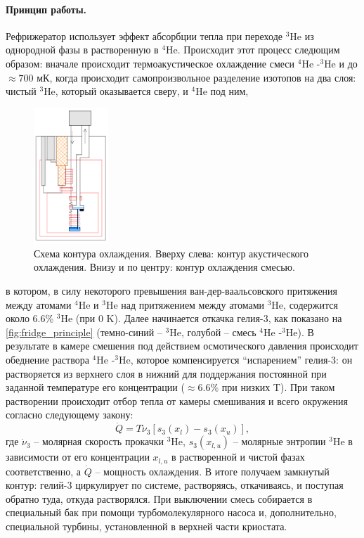 \documentclass[12pt, twoside]{report}
\numberwithin{equation}{section}
\numberwithin{figure}{section}
\begin{document}
\paragraph{Принцип работы.} Рефрижератор использует эффект абсорбции тепла при переходе $^3$He из однородной фазы в растворенную в $^4$He. Происходит этот процесс следющим образом: вначале происходит термоакустическое охлаждение смеси $^4$He -$^3$He и до $\approx 700$ мК, когда происходит самопроизвольное разделение изотопов на два слоя: чистый $^3$He, который оказывается сверу, и $^4$He под ним,  
\begin{figure}
\begingroup
\captionsetup{justification=normal}
\centering
\includegraphics[width=0.25\textwidth]{Pictures/fridge_principle}
\caption{Схема контура охлаждения. Вверху слева: контур акустического охлаждения. Внизу и по центру: контур охлаждения смесью.}
\label{fig:fridge_principle}
\endgroup
\end{figure}
в котором, в силу некоторого превышения ван-дер-ваальсовского притяжения между атомами $^4$He и $^3$He над притяжением между атомами $^3$He, содержится около 6.6\% $^3$He (при 0 K).
Далее начинается откачка гелия-3, как показано на \autoref{fig:fridge_principle} (темно-синий -- $^3$He, голубой -- смесь $^4$He -$^3$He). В результате в камере смешения под действием осмотического давления происходит обеднение раствора $^4$He -$^3$He, которое компенсируется ``испарением'' гелия-3: он растворяется из верхнего слоя в нижний для поддержания постоянной при заданной температуре его концентрации ($\approx 6.6\%$ при низких T). При таком растворении происходит отбор тепла от камеры смешивания и всего окружения согласно следующему закону:
$$ \dot Q = T \dot \nu_3[s_3(x_l) - s_3(x_u)], $$
где $\dot \nu_3$ -- молярная скорость прокачки $^{3}$He, $s_3(x_{l, u})$ -- молярные энтропии $^{3}$He в зависимости от его концентрации $x_{l, u}$ в растворенной и чистой фазах соответственно, а $\dot Q$ -- мощность охлаждения. В итоге получаем замкнутый контур: гелий-3 циркулирует по системе, растворяясь, откачиваясь, и поступая обратно туда, откуда растворялся.
При выключении смесь собирается в специальный бак при помощи турбомолекулярного насоса и, дополнительно, специальной турбины, установленной в верхней части криостата. 
\end{document}
